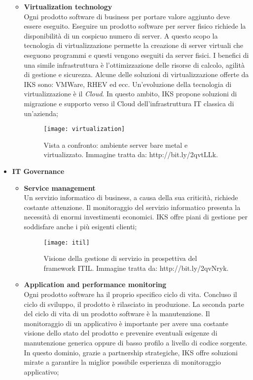 \begin{itemize}
\begin{itemize}
		\item \textbf{Virtualization technology}\\
		 Ogni prodotto software di business per portare valore aggiunto 
		 deve essere eseguito. Eseguire un prodotto software per server 
		 fisico richiede la disponibilità di un cospicuo numero di server. 
		 A questo scopo la tecnologia di virtualizzazione permette la 
		 creazione di server virtuali che eseguono programmi e questi 
		 vengono eseguiti da server fisici. I benefici di una simile 
		 infrastruttura è l'ottimizzazione delle risorse di calcolo, 
		 agilità di gestione e sicurezza. Alcune delle soluzioni di 
		 virtualizzazione offerte da IKS sono: VMWare, RHEV ed ecc. 
		 Un'evoluzione della tecnologia di virtualizzazione è il \emph{Cloud}. 
		 In questo ambito, IKS propone soluzioni di migrazione e supporto 
		 verso il Cloud dell'infrastruttura IT classica di un'azienda;  
		 \begin{figure}[htbp]
			\begin{center}
				\texttt{[image: virtualization]}
				\caption{Vista a confronto: ambiente 
				server bare metal e virtualizzato. 
				Immagine tratta da: http://bit.ly/2qvtLLk.}
			\end{center}
		 \end{figure}
 	\end{itemize}

	\item \textbf{IT Governance}\\
	\begin{itemize}
		\item \textbf{Service management}\\
		Un servizio informatico di business, a causa della sua criticità,
		richiede costante attenzione. Il monitoraggio del servizio 
		informatico presenta la necessità di enormi investimenti 
		economici. IKS offre piani di gestione per soddisfare 
		anche i più esigenti clienti;
	    
	    \begin{figure}[htbp]
	    	\begin{center}
	    		\texttt{[image: itil]}
	    		\caption{Visione della gestione di servizio in 
				prospettiva del \gls{framework} ITIL. Immagine tratta da: 
				http://bit.ly/2qvNryk.}
	    	\end{center}
	    \end{figure}
	    
		\item \textbf{Application and performance monitoring}\\ 
		Ogni prodotto software ha il proprio specifico ciclo di vita. 
		Concluso il ciclo di sviluppo, il prodotto è rilasciato in 
		produzione. La seconda parte del ciclo di vita di un prodotto 
		software è la manutenzione. Il monitoraggio di un applicativo 
		è importante per avere una costante visione dello stato del 
		prodotto e prevenire eventuali esigenze di manutenzione generica 
		oppure di basso profilo a livello di codice sorgente. In questo 
		dominio, grazie a partnership strategiche, IKS offre soluzioni 
		mirate a garantire la miglior possibile esperienza di 
		monitoraggio applicativo;
		

\end{itemize}
\end{itemize}
